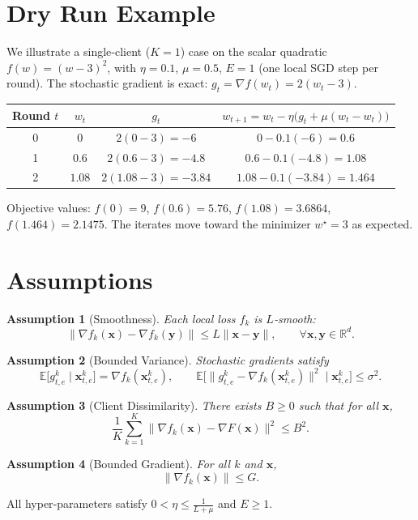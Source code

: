 \documentclass{article}
\newtheorem{assumption}{Assumption}
\begin{document}
\section*{Dry Run Example}
We illustrate a single‑client ($K=1$) case on the scalar quadratic 
$f(w)=(w-3)^2$, with $\eta=0.1$, $\mu=0.5$, $E=1$ (one local SGD step per round).  
The stochastic gradient is exact: $g_t=\nabla f(w_t)=2(w_t-3)$.

\begin{center}
\begin{tabular}{c|c|c|c}
Round $t$ & $w_t$ & $g_t$ & $w_{t+1}=w_t-\eta\big(g_t+\mu(w_t-w_t)\big)$\\\hline
0 & $0$ & $2(0-3)=-6$ & $0-0.1(-6)=0.6$ \\
1 & $0.6$ & $2(0.6-3)=-4.8$ & $0.6-0.1(-4.8)=1.08$ \\
2 & $1.08$ & $2(1.08-3)=-3.84$ & $1.08-0.1(-3.84)=1.464$ \\
\end{tabular}
\end{center}
Objective values: $f(0)=9$, $f(0.6)=5.76$, $f(1.08)=3.6864$, $f(1.464)=2.1475$.  
The iterates move toward the minimizer $w^\star=3$ as expected.

\newpage
\section*{Assumptions}
\begin{assumption}[Smoothness]\label{as:smooth}
Each local loss $f_k$ is $L$‑smooth:
\[
\|\nabla f_k(\mathbf{x})-\nabla f_k(\mathbf{y})\|\le L\|\mathbf{x}-\mathbf{y}\|,
\qquad\forall\mathbf{x},\mathbf{y}\in\mathbb{R}^d .
\]
\end{assumption}
\begin{assumption}[Bounded Variance]\label{as:var}
Stochastic gradients satisfy
\[
\mathbb{E}\big[ g_{t,e}^{k}\mid\mathbf{x}^{k}_{t,e}\big]=\nabla f_k(\mathbf{x}^{k}_{t,e}),\qquad
\mathbb{E}\big[\|g_{t,e}^{k}-\nabla f_k(\mathbf{x}^{k}_{t,e})\|^2\mid\mathbf{x}^{k}_{t,e}\big]\le\sigma^2 .
\]
\end{assumption}
\begin{assumption}[Client Dissimilarity]\label{as:dissim}
There exists $B\ge0$ such that for all $\mathbf{x}$,
\[
\frac{1}{K}\sum_{k=1}^{K}\|\nabla f_k(\mathbf{x})-\nabla F(\mathbf{x})\|^2\le B^2 .
\]
\end{assumption}
\begin{assumption}[Bounded Gradient]\label{as:bound}
For all $k$ and $\mathbf{x}$,
\[
\|\nabla f_k(\mathbf{x})\| \le G .
\]
\end{assumption}
All hyper‑parameters satisfy $0<\eta\le \frac{1}{L+\mu}$ and $E\ge1$.
\end{document}

